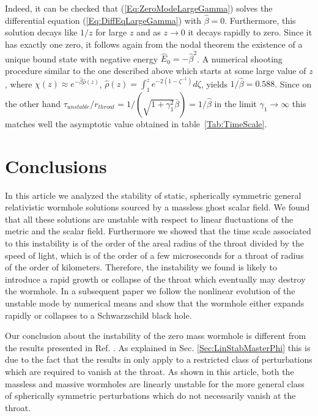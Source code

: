 \documentclass[           %
               showpacs,            %
               preprintnumbers,     %
               aps,                 %
               prd,                 %
               superscriptaddress,      %
               nofootinbib,         %
               tightenlines,        %
               floats,floatfix      %
               ]{revtex4}
\begin{document}
Indeed, it can be checked that (\ref{Eq:ZeroModeLargeGamma}) solves
the differential equation (\ref{Eq:DiffEqLargeGamma}) with
$\hat{\beta} = 0$. Furthermore, this solution decays like $1/z$ for
large $z$ and as $z \to 0$ it decays rapidly to zero. Since it has
exactly one zero, it follows again from the nodal theorem the
existence of a unique bound state with negative energy $\hat{E}_0 =
-\hat{\beta}^2$. A numerical shooting procedure similar to the one
described above which starts at some large value of $z$, where
$\chi(z) \approx e^{-\hat{\beta}\hat{\rho}(z)}$, $\hat{\rho}(z) =
\int_1^z e^{-2(1-\zeta^{-1})} d\zeta$, yields $1/\hat{\beta} = 0.588$.
Since on the other hand $\tau_{unstable}/r_{throat} =
1/(\sqrt{1+\gamma_1^2}\bar{\beta}) = 1/\hat{\beta}$ in the limit
$\gamma_1\to\infty$ this matches well the asymptotic value obtained in
table~\ref{Tab:TimeScale}.





\section{Conclusions}
\label{Sec:Conclusions}

In this article we analyzed the stability of static, spherically
symmetric general relativistic wormhole solutions sourced by a
massless ghost scalar field. We found that all these solutions are
unstable with respect to linear fluctuations of the metric and the
scalar field. Furthermore we showed that the time scale associated to
this instability is of the order of the areal radius of the throat
divided by the speed of light, which is of the order of a few
microseconds for a throat of radius of the order of kilometers.
Therefore, the instability we found is likely to introduce a rapid
growth or collapse of the throat which eventually may destroy the
wormhole. In a subsequent paper \cite{jGfGoS-inprep2} we follow the
nonlinear evolution of the unstable mode by numerical means and show
that the wormhole either expands rapidly or collapses to a
Schwarzschild black hole.

Our conclusion about the instability of the zero mass wormhole is
different from the results presented in Ref. \cite{cA02}. As explained
in Sec. \ref{Sec:LinStabMasterPhi} this is due to the fact that the
results in \cite{cA02} only apply to a restricted class of
perturbations which are required to vanish at the throat. As shown in
this article, both the massless and massive wormholes are linearly
unstable for the more general class of spherically symmetric
perturbations which do not necessarily vanish at the throat.
\end{document}
